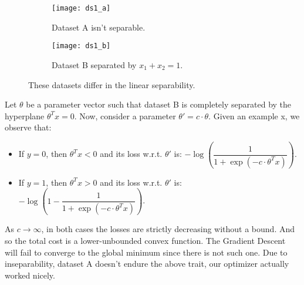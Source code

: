 \begin{answer}
	\begin{figure}[H]
	\centering
	\begin{subfigure}[H]{0.45\linewidth}
		\texttt{[image: ds1\_a]}
		\caption{Dataset A isn't separable.}
	\end{subfigure}
	\begin{subfigure}[H]{0.45\linewidth}
		\texttt{[image: ds1\_b]}
		\caption{Dataset B separated by $ x_1 + x_2 = 1$.}
	\end{subfigure}
	\caption{These datasets differ in the linear separability.}
	\end{figure}
Let $\theta$ be a parameter vector such that dataset B is completely separated 
by the hyperplane $\theta^{T} x = 0$. Now, consider a parameter $\theta' = c 
\cdot \theta$. Given an example x, we observe that:
\begin{itemize}
	\item If $y=0$, then $\theta^{T} x < 0$ and its loss w.r.t. $\theta'$ is: 
	$-\log \left(\dfrac{1}{1 + \exp (-c\cdot\theta^T x)} \right)$.
	\item If $y=1$, then $\theta^T x > 0$ and its loss w.r.t. $\theta'$ is: 
	$-\log \left(1 - \dfrac{1}{1 + \exp (-c\cdot\theta^T x)} \right)$.
\end{itemize}
As $c \to \infty$, in both cases the losses are strictly decreasing without a 
bound. And so the total cost is a lower-unbounded convex function. The 
Gradient Descent will fail to converge to the global minimum since there is not 
such one. Due to inseparability, dataset A doesn't endure the above trait, our optimizer actually worked nicely. \\
\end{answer}
